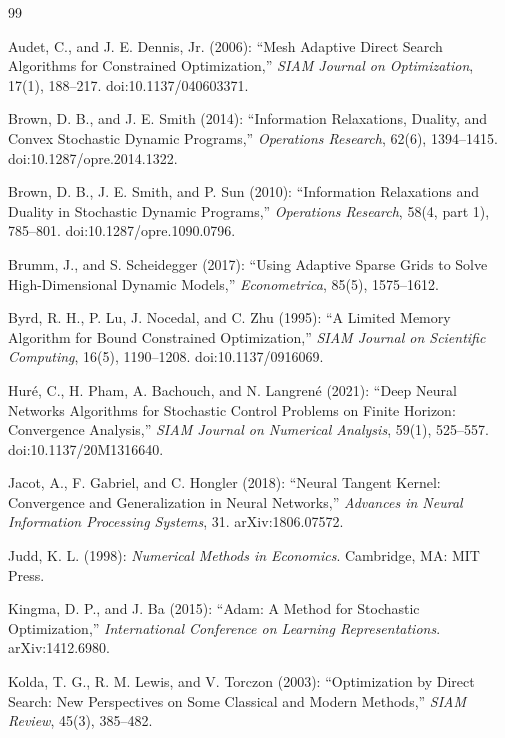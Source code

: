 \begin{thebibliography}{99}

Audet, C., and J. E. Dennis, Jr. (2006): ``Mesh Adaptive Direct Search Algorithms for Constrained Optimization,'' \emph{SIAM Journal on Optimization}, 17(1), 188--217. doi:10.1137/040603371.


Brown, D. B., and J. E. Smith (2014): ``Information Relaxations, Duality, and Convex Stochastic Dynamic Programs,'' \emph{Operations Research}, 62(6), 1394--1415. doi:10.1287/opre.2014.1322.


Brown, D. B., J. E. Smith, and P. Sun (2010): ``Information Relaxations and Duality in Stochastic Dynamic Programs,'' \emph{Operations Research}, 58(4, part 1), 785--801. doi:10.1287/opre.1090.0796.


Brumm, J., and S. Scheidegger (2017): ``Using Adaptive Sparse Grids to Solve High-Dimensional Dynamic Models,'' \emph{Econometrica}, 85(5), 1575--1612.


Byrd, R. H., P. Lu, J. Nocedal, and C. Zhu (1995): ``A Limited Memory Algorithm for Bound Constrained Optimization,'' \emph{SIAM Journal on Scientific Computing}, 16(5), 1190--1208. doi:10.1137/0916069.


Hur\'e, C., H. Pham, A. Bachouch, and N. Langren\'e (2021): ``Deep Neural Networks Algorithms for Stochastic Control Problems on Finite Horizon: Convergence Analysis,'' \emph{SIAM Journal on Numerical Analysis}, 59(1), 525--557. doi:10.1137/20M1316640.


Jacot, A., F. Gabriel, and C. Hongler (2018): ``Neural Tangent Kernel: Convergence and Generalization in Neural Networks,'' \emph{Advances in Neural Information Processing Systems}, 31. arXiv:1806.07572.


Judd, K. L. (1998): \emph{Numerical Methods in Economics}. Cambridge, MA: MIT Press.


Kingma, D. P., and J. Ba (2015): ``Adam: A Method for Stochastic Optimization,'' \emph{International Conference on Learning Representations}. arXiv:1412.6980.


Kolda, T. G., R. M. Lewis, and V. Torczon (2003): ``Optimization by Direct Search: New Perspectives on Some Classical and Modern Methods,'' \emph{SIAM Review}, 45(3), 385--482.



\end{thebibliography}
